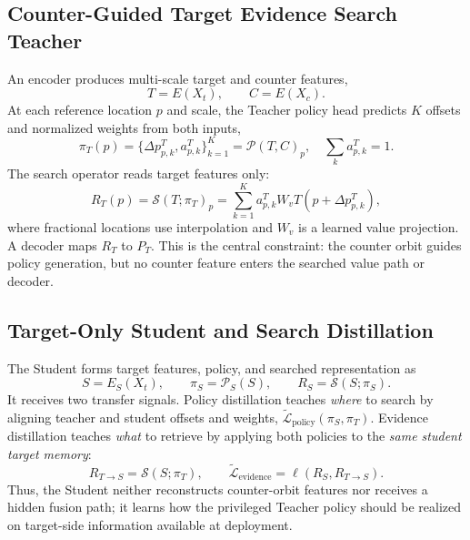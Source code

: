 \subsection{Counter-Guided Target Evidence Search Teacher}
An encoder produces multi-scale target and counter features,
\begin{equation}
T=E(X_t), \qquad C=E(X_c).
\label{eq:teacher_features}
\end{equation}
At each reference location $p$ and scale, the Teacher policy head predicts $K$ offsets and normalized weights from both inputs,
\begin{equation}
\pi_T(p)=\{\Delta p^T_{p,k},a^T_{p,k}\}_{k=1}^{K}=\mathcal{P}(T,C)_p,
\quad \sum_k a^T_{p,k}=1.
\label{eq:teacher_policy}
\end{equation}
The search operator reads target features only:
\begin{equation}
R_T(p)=\mathcal{S}(T;\pi_T)_p=
\sum_{k=1}^{K}a^T_{p,k}W_vT(p+\Delta p^T_{p,k}),
\label{eq:teacher_search}
\end{equation}
where fractional locations use interpolation and $W_v$ is a learned value projection. A decoder maps $R_T$ to $P_T$. This is the central constraint: the counter orbit guides policy generation, but no counter feature enters the searched value path or decoder.

\subsection{Target-Only Student and Search Distillation}
The Student forms target features, policy, and searched representation as
\begin{equation}
S=E_S(X_t), \qquad \pi_S=\mathcal{P}_S(S), \qquad R_S=\mathcal{S}(S;\pi_S).
\label{eq:student_search}
\end{equation}
It receives two transfer signals. Policy distillation teaches \emph{where} to search by aligning teacher and student offsets and weights, $\widetilde{\mathcal{L}}_{\mathrm{policy}}(\pi_S,\pi_T)$. Evidence distillation teaches \emph{what} to retrieve by applying both policies to the \emph{same student target memory}:
\begin{equation}
R_{T\rightarrow S}=\mathcal{S}(S;\pi_T), \qquad
\widetilde{\mathcal{L}}_{\mathrm{evidence}}=\ell(R_S,R_{T\rightarrow S}).
\label{eq:shared_memory}
\end{equation}
Thus, the Student neither reconstructs counter-orbit features nor receives a hidden fusion path; it learns how the privileged Teacher policy should be realized on target-side information available at deployment.

